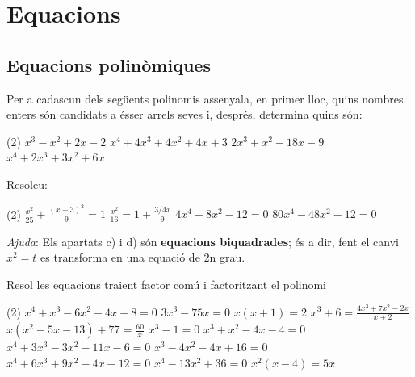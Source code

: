 \section{Equacions}
\vspace{-0.5cm}
\begin{minipage}{0.8\textwidth}
	\subsection{Equacions polinòmiques}
\end{minipage}
\begin{minipage}{0.1\textwidth}
	\centering
\end{minipage}

\begin{mylist}
	

	\exer  Per a cadascun dels següents polinomis assenyala, en primer lloc, quins nombres enters són candidats a ésser arrels seves i, després, determina quins  són:   
	\begin{tasks}(2)
		\task $x^{3} -x^{2} +2x-2$      \task $x^{4} +4x^{3} +4x^{2} +4x+3$   
		\task $2x^{3} +x^{2} -18x-9$    \task $x^{4} +2x^{3} +3x^{2} +6x$   
	\end{tasks}
		

 
	\exer  Resoleu:  	
	\begin{tasks}(2) 
		\task$\frac{x^{2} }{25} +\frac{(x+3)^{2} }{9} =1$ 
		\task $\frac{x^{2} }{16} =1+\frac{3/4x}{9} $ 
		\task $4x^4+8x^2-12=0$
		 \task $80x^{4} -48x^{2} -12=0$ 
	\end{tasks}

	\textit{Ajuda}: Els apartats c) i d) són \textbf{equacions biquadrades}; és a dir, fent el canvi $x^2=t$ es transforma en una equació de 2n grau.
	
	\answers[cols=1]{[$x=-\dfrac{75}{17}$ i $x=0$, $x=\frac{2\pm 2\sqrt{37}}{3}$, $x=\pm 1$, $x=\pm \sqrt{\dfrac{3\pm \sqrt{24}}{10}}$]}

 	
\exer[1] Resol les equacions traient factor com\'{u} i factoritzant el polinomi 
\begin{tasks}(2)
	\task  $x^{4} +x^{3} -6x^{2} -4x+8=0$ 
	\task  $3x^{3} -75x=0$
	\task  $x(x+1)=2$   
	\task $x^{3} +6=\frac{4x^{3} +7x^{2} -2x}{x+2} $
	\task  $x(x^{2} -5x-13)+77=\frac{60}{x} $ 
	\task  $x^{3} -1=0$
	\task  $x^{3} +x^{2} -4x-4=0$ 
	\task  $x^{4} +3x^{3} -3x^{2} -11x-6=0$
	\task  $x^{3} -4x^{2} -4x+16=0$ 
	\task  $x^{4} +6x^{3} +9x^{2} -4x-12=0$
	\task  $x^{4} -13x^{2} +36=0$  
	\task $x^{2} (x-4)=5x$
\end{tasks}
\answers[cols=2]{[ 
		 $x=1,\,2,\,-2$,        $x=0,\,5,\,-5$,              $x=1,\,-2$,         $x=\pm2,\,3,\,-1$,
		  $x=1,\,3,\,5,\,-4$,    $x=1$,                  $x=-2,\,-1,\,2$,             $x=-3,\,-1,\,2$,
		   $x=-2,\,2,\,4$,      $x=-3,\,-2,\,1$,       $x=-3,\,3,\,-2,\,2$,   $x=-1,\,0,\,5$
]}


\end{mylist}
